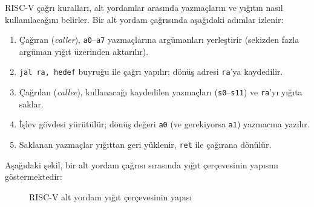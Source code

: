 RISC-V çağrı kuralları, alt yordamlar arasında yazmaçların ve yığıtın nasıl kullanılacağını belirler. Bir alt yordam çağrısında aşağıdaki adımlar izlenir:

\begin{enumerate}
    \item Çağıran (\emph{caller}), \texttt{a0}--\texttt{a7} yazmaçlarına argümanları yerleştirir (sekizden fazla argüman yığıt üzerinden aktarılır).
    \item \texttt{jal ra, hedef} buyruğu ile çağrı yapılır; dönüş adresi \texttt{ra}'ya kaydedilir.
    \item Çağrılan (\emph{callee}), kullanacağı kaydedilen yazmaçları (\texttt{s0}--\texttt{s11}) ve \texttt{ra}'yı yığıta saklar.
    \item İşlev gövdesi yürütülür; dönüş değeri \texttt{a0} (ve gerekiyorsa \texttt{a1}) yazmacına yazılır.
    \item Saklanan yazmaçlar yığıttan geri yüklenir, \texttt{ret} ile çağırana dönülür.
\end{enumerate}

Aşağıdaki şekil, bir alt yordam çağrısı sırasında yığıt çerçevesinin yapısını göstermektedir:

\begin{figure}[H]
\centering
{}
\caption{RISC-V alt yordam yığıt çerçevesinin yapısı}
\label{fig:ekc-yigit-cerceve}
\end{figure}

